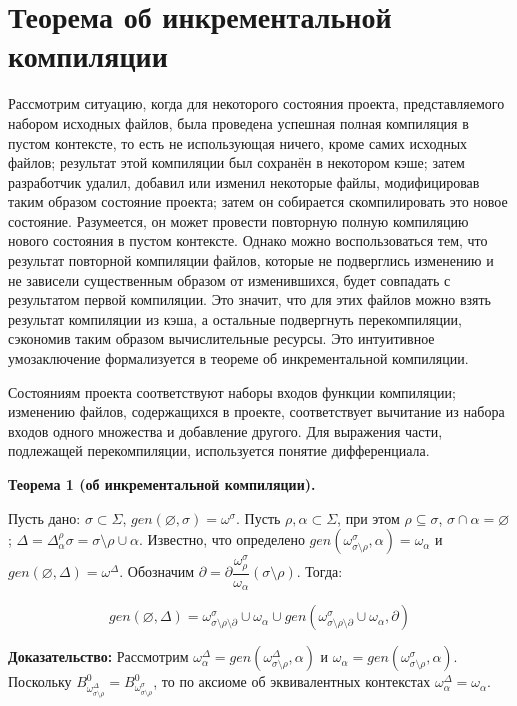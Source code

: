 \section{Теорема об инкрементальной компиляции}

Рассмотрим ситуацию, когда для некоторого состояния проекта, представляемого набором исходных файлов, была проведена успешная полная компиляция в пустом контексте, то есть не использующая ничего, кроме самих исходных файлов; результат этой компиляции был сохранён в некотором кэше; затем разработчик удалил, добавил или изменил некоторые файлы, модифицировав таким образом состояние проекта; затем он собирается скомпилировать это новое состояние. Разумеется, он может провести повторную полную компиляцию нового состояния в пустом контексте. Однако можно воспользоваться тем, что результат повторной компиляции файлов, которые не подверглись изменению и не зависели существенным образом от изменившихся, будет совпадать с результатом первой компиляции. Это значит, что для этих файлов можно взять результат компиляции из кэша, а остальные подвергнуть перекомпиляции, сэкономив таким образом вычислительные ресурсы. Это интуитивное умозаключение формализуется в теореме об инкрементальной компиляции.

Состояниям проекта соответствуют наборы входов функции компиляции; изменению файлов, содержащихся в проекте, соответствует вычитание из набора входов одного множества и добавление другого. Для выражения части, подлежащей перекомпиляции, используется понятие дифференциала.\\

\newcommand{\butpartial}{\sigma\setminus\rho\setminus\partial}

\textbf{Теорема 1 (об инкрементальной компиляции).}

Пусть дано: $\sigma \subset \Sigma$, $gen(\varnothing, \sigma) = \omega^\sigma$. Пусть $\rho, \alpha \subset \Sigma$, при этом $\rho \subseteq \sigma$, $\sigma \cap \alpha = \varnothing$; $\Delta = \Delta^\rho_\alpha\sigma = \sigma\setminus\rho\cup\alpha$. Известно, что определено $gen(\omega^\sigma_{\sigma\setminus\rho}, \alpha) = \omega_\alpha$ и $gen(\varnothing, \Delta) = \omega^\Delta$. Обозначим $\partial = \partial\dfrac{\omega^\sigma_\rho}{\omega_\alpha}(\sigma\setminus\rho)$.
Тогда:

$$gen(\varnothing, \Delta) = \omega^\sigma_{\butpartial} \cup \omega_\alpha \cup gen(\omega^\sigma_{\butpartial} \cup \omega_\alpha, \partial)$$

\textbf{Доказательство:}
Рассмотрим $\omega^\Delta_\alpha = gen(\omega^\Delta_{\sigma\setminus\rho}, \alpha)$ и $\omega_\alpha = gen(\omega^\sigma_{\sigma\setminus\rho}, \alpha)$. Поскольку $B^0_{\omega^\Delta_{\sigma\setminus\rho}} = B^0_{\omega^\sigma_{\sigma\setminus\rho}}$, то по аксиоме об эквивалентных контекстах $\omega^\Delta_\alpha = \omega_\alpha$.

